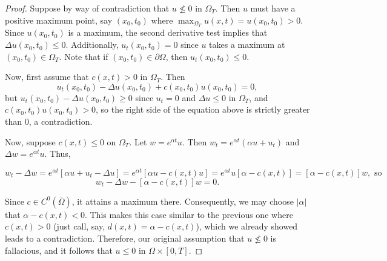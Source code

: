 \documentclass[11pt,oneside,english]{amsart}
\theoremstyle{definition}
\begin{document}
\begin{enumerate}
\begin{proof}
Suppose by way of contradiction that $u\not\leq0$ in $\Omega_T$. Then $u$ must have a positive maximum point, say $(x_0,t_0)$ where $\max_{\Omega_T}u(x,t)=u(x_0,t_0)>0$. Since $u(x_0,t_0)$ is a maximum, the second derivative test implies that $\Delta u(x_0,t_0)\leq 0$. Additionally, $u_t(x_0,t_0)=0$ since $u$ takes a maximum at $(x_0,t_0)\in\Omega_T$. Note that if $(x_0,t_0)\in\partial\Omega$, then $u_t(x_0,t_0)\leq0$.

Now, first assume that $c(x,t)>0$ in $\Omega_T$. Then
\[
u_t(x_0,t_0)-\Delta u(x_0,t_0)+c(x_0,t_0)u(x_0,t_0)=0,
\]
but $u_t(x_0,t_0)-\Delta u(x_0,t_0)\geq0$ since $u_t=0$ and $\Delta u\leq 0$ in $\Omega_T$, and $c(x_0,t_0)u(x_0,t_0)>0$, so the right side of the equation above is strictly greater than 0, a contradiction. 

Now, suppose $c(x,t)\leq0$ on $\Omega_T$. Let $w=e^{\alpha t}u$. Then $w_t=e^{\alpha t}(\alpha u+u_t)$ and $\Delta w=e^{\alpha t}u$. Thus,

$$
w_t-\Delta w=e^{\alpha t}[\alpha u+u_t-\Delta u]=e^{\alpha t}[\alpha u-c(x,t)u]=e^{\alpha t}u[\alpha -c(x,t)]=[\alpha-c(x,t)]w,\text{ so}
$$
$$w_t-\Delta w-[\alpha-c(x,t)]w=0.$$

Since $c\in C^0(\bar{\Omega})$, it attains a maximum there. Consequently, we may choose $|\alpha|$ that $\alpha-c(x,t)< 0$. This makes this case similar to the previous one where $c(x,t)>0$ (just call, say, $d(x,t)=\alpha-c(x,t)$), which we already showed leads to a contradiction. Therefore, our original assumption that $u\not\leq 0$ is fallacious, and it follows that $u\leq0$ in $\Omega\times[0,T]$.
\end{proof}


\end{enumerate}
\end{document}
